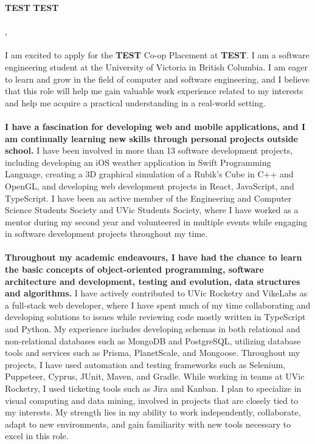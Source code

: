 \documentclass[a4paper, 12pt, oneside]{letter}
\newcommand{\Position}{TEST}
\newcommand{\CompanyName}{TEST}
\newcommand{\CompanyNameSuffix}{TEST}
\newcommand{\Division}{TEST}
\newcommand{\LocationCity}{TEST}
\newcommand{\LocationState}{TEST}
\begin{document}
\textbf{\CompanyName}\textbf{ \CompanyNameSuffix} \\
\text{Division: \Division} \\
\vspace{20pt}\text{Location: \LocationCity}, \text{\LocationState} \\
\vspace{10pt} \\
 I am excited to apply for the {\fontsize{11}{11.5}\selectfont \bfseries \Position} Co-op Placement at {\fontsize{11}{11.5}\selectfont \bfseries \CompanyName}. I am a software engineering student at the University of Victoria in British Columbia. I am eager to learn and grow in the field of computer and software engineering, and I believe that this role will help me gain valuable work experience related to my interests and help me acquire a practical understanding in a real-world setting. \vspace{-7pt}\\\\
{\fontsize{11}{11.5}\selectfont \bfseries I have a fascination for developing web and mobile applications, and I am continually learning new skills through personal projects outside school.} I have been involved in more than 13 software development projects, including developing an iOS weather application in Swift Programming Language, creating a 3D graphical simulation of a Rubik’s Cube in C++ and OpenGL, and developing web development projects in React, JavaScript, and TypeScript. I have been an active member of the Engineering and Computer Science Students Society and UVic Students Society, where I have worked as a mentor during my second year and volunteered in multiple events while engaging in software development projects throughout my time. \vspace{-7pt}\\\\
{\fontsize{11}{11.5}\selectfont \bfseries Throughout my academic endeavours, I have had the chance to learn the basic concepts of object-oriented programming, software architecture and development, testing and evolution, data structures and algorithms.} I have actively contributed to UVic Rocketry and VikeLabs as a full-stack web developer, where I have spent much of my time collaborating and developing solutions to issues while reviewing code mostly written in TypeScript and Python. My experience includes developing schemas in both relational and non-relational databases such as MongoDB and PostgreSQL, utilizing database tools and services such as Prisma, PlanetScale, and Mongoose. Throughout my projects, I have used automation and testing frameworks such as Selenium, Puppeteer, Cyprus, JUnit, Maven, and Gradle. While working in teams at UVic Rocketry, I used ticketing tools such as Jira and Kanban. I plan to specialize in visual computing and data mining, involved in projects that are closely tied to my interests. My strength lies in my ability to work independently, collaborate, adapt to new environments, and gain familiarity with new tools necessary to excel in this role. \vspace{-7pt}\\\\
\end{document}
